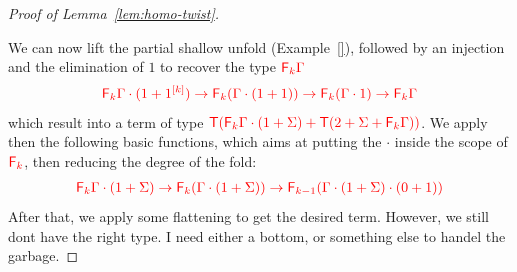 \begin{proof}[Proof of Lemma~\ref{lem:homo-twist}]
\begin{center}
  \end{center}
  We can now lift the partial shallow unfold (Example~\ref{}), followed by an injection and the elimination of $1$ to recover the type $\ranked{\reduce k \Gamma}$
  \begin{align*}
  \ranked{\reduce k \Gamma\cdot(1+\mati k 1)\to \reduce k (\Gamma\cdot(1+1))\to \reduce k (\Gamma\cdot 1) \to  \reduce k \Gamma}
\end{align*}
which result into a term of type $\ranked{\tmonad(\reduce k\Gamma\cdot(1+\Sigma)+\tmonad(2+\Sigma+\reduce k \Gamma))}$. We apply then the following basic functions, which aims at putting the $\cdot$ inside the scope of $\reduce k$, then reducing the degree of the fold:
\begin{align*}
\ranked{\reduce k\Gamma\cdot(1+\Sigma)\to \reduce k(\Gamma\cdot(1+\Sigma))\to \reduce {k-1}(\Gamma\cdot(1+\Sigma)\cdot (0+1)) }
\end{align*}
After that, we apply some flattening to get the desired term. However, we still dont have the right type. I need either a bottom, or something else to handel the garbage.
\end{proof}

